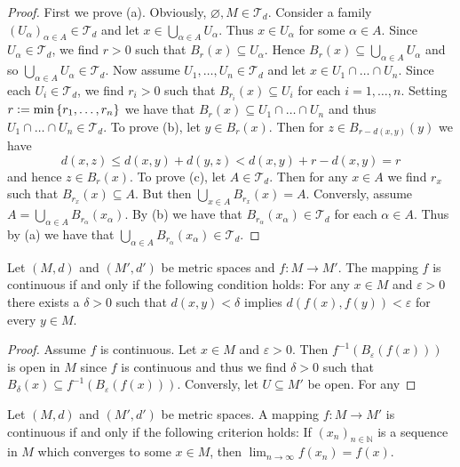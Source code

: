 \begin{proof}
	First we prove (a). Obviously, $\varnothing,M \in \mathcal{T}_d$. Consider a family $(U_\alpha)_{\alpha \in A} \in \mathcal{T}_d$ and let $x \in \bigcup_{\alpha \in A} U_\alpha$. Thus $x \in U_\alpha$ for some $\alpha \in A$. Since $U_\alpha \in \mathcal{T}_d$, we find $r > 0$ such that $B_r(x) \subseteq U_\alpha$. Hence $B_r(x) \subseteq \bigcup_{\alpha \in A} U_\alpha$ and so $\bigcup_{\alpha \in A}U_\alpha \in \mathcal{T}_d$. Now assume $U_1, \dots,U_n \in \mathcal{T}_d$ and let $x \in U_1 \cap \dots \cap U_n$. Since each $U_i \in \mathcal{T}_d$, we find $r_i > 0$ such that $B_{r_i}(x) \subseteq U_i$ for each $i = 1,\dots,n$. Setting $r:= \min\cbr[0]{r_1,\dots,r_n}$ we have that $B_r(x) \subseteq U_1 \cap \dots \cap U_n$ and thus $U_1 \cap \dots \cap U_n \in \mathcal{T}_d$.
	To prove (b), let $y \in B_r(x)$. Then for $z \in B_{r - d(x,y)}(y)$ we have
	\begin{equation}
		d(x,z) \leq d(x,y) + d(y,z) < d(x,y) + r - d(x,y) = r
	\end{equation}
	\noindent and hence $z \in B_r(x)$. 
	To prove (c), let $A \in \mathcal{T}_d$. Then for any $x \in A$ we find $r_x$ such that $B_{r_x}(x) \subseteq A$. But then $\bigcup_{x \in A} B_{r_x}(x) = A$. Conversly, assume $A = \bigcup_{\alpha \in A} B_{r_\alpha}(x_\alpha)$. By (b) we have that $B_{r_\alpha}(x_\alpha) \in \mathcal{T}_d$ for each $\alpha \in A$. Thus by (a) we have that $\bigcup_{\alpha \in A} B_{r_\alpha}(x_\alpha) \in \mathcal{T}_d$.
\end{proof}

\begin{proposition}
	Let $(M,d)$ and $(M',d')$ be metric spaces and $f: M \to M'$. The mapping $f$ is continuous if and only if the following condition holds: For any $x \in M$ and $\varepsilon > 0$ there exists a $\delta > 0$ such that $d(x,y) < \delta$ implies $d(f(x),f(y)) < \varepsilon$ for every $y \in M$.
	\label{prop:metric_continuity}
\end{proposition}

\begin{proof}
	Assume $f$ is continuous. Let $x \in M$ and $\varepsilon > 0$. Then $f^{-1}(B_\varepsilon(f(x)))$ is open in $M$ since $f$ is continuous and thus we find $\delta > 0$ such that $B_\delta(x) \subseteq f^{-1}(B_\varepsilon(f(x)))$. Conversly, let $U \subseteq M'$ be open. For any 	
\end{proof}

\begin{proposition}
	Let $(M,d)$ and $(M',d')$ be metric spaces. A mapping $f: M \to M'$ is continuous if and only if the following criterion holds: If $(x_n)_{n \in \mathbb{N}}$ is a sequence in $M$ which converges to some $x \in M$, then $\lim_{n \to \infty} f(x_n) = f(x)$.
	\label{prop:sequence_criterion_continuity}
\end{proposition}

